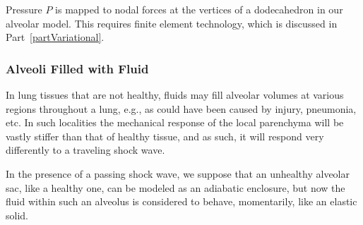 Pressure $P$ is mapped to nodal forces at the vertices of a dodecahedron in our alveolar model.  This requires finite element technology, which is discussed in Part~\ref{partVariational}.

\subsubsection{Alveoli Filled with Fluid}

In lung tissues that are not healthy, fluids may fill alveolar volumes at various regions throughout a lung, e.g., as could have been caused by injury, pneumonia, etc.  In such localities the mechanical response of the local parenchyma will be vastly stiffer than that of healthy tissue, and as such, it will respond very differently to a traveling shock wave.

In the presence of a passing shock wave, we suppose that an unhealthy alveolar sac, like a healthy one, can be modeled as an adiabatic enclosure, but now the fluid within such an alveolus is considered to behave, momentarily, like an elastic solid.

